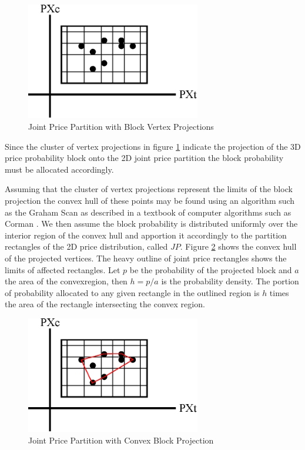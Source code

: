 \begin{figure}
  \centering
  \includegraphics[width=3in]{Images/ptc_rectangle}
  \caption[Joint Price Partition with Block Vertex Projections]
          {Joint Price Partition with Block Vertex Projections}
  \label{fig:ptc_rectangle}
\end{figure}

Since the cluster of vertex projections in figure \ref{fig:ptc_rectangle} indicate the projection of the 3D price probability block onto the 2D joint price partition the block probability must be allocated accordingly. 

Assuming that the cluster of vertex projections represent the limits of the block projection the convex hull of these points may be found using an algorithm such as the Graham Scan as described in a textbook of computer algorithms such as Corman \cite{corman09}. We then assume the block probability is distributed uniformly over the interior region of the convex hull and apportion it accordingly to the partition rectangles of the 2D price distribution, called $JP$. Figure \ref{fig:ptc_rectangle_convex} shows the convex hull of the projected vertices. The heavy outline of joint price rectangles shows the limits of affected rectangles. Let $p$ be the probability of the projected block and $a$ the area of the convexregion, then $h = p/a$ is the probability density. The portion of probability allocated to any given rectangle in the outlined region is $h$ times the area of the rectangle intersecting the convex region.

\begin{figure}
  \centering
  \includegraphics[width=3in]{Images/ptc_rectangle_convex}
  \caption[Joint Price Partition with Convex Block Projection]
          {Joint Price Partition with Convex Block Projection}
  \label{fig:ptc_rectangle_convex}
\end{figure}

